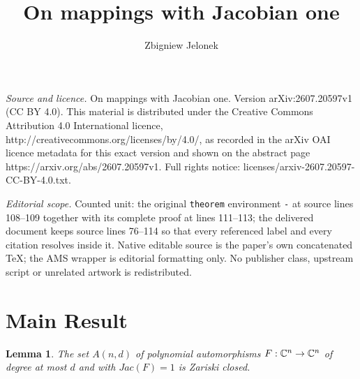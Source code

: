 \documentclass[10pt,a4paper]{amsart}
\newtheorem{lemma}[theorem]{Lemma}
\begin{document}
\title[On mappings with Jacobian one]{On mappings with Jacobian one}
\author{Zbigniew Jelonek}
\date{}
\maketitle
\noindent\emph{Source and licence.} On mappings with Jacobian one. Version arXiv:2607.20597v1 (CC BY 4.0). This material is distributed under the Creative Commons Attribution 4.0 International licence, http://creativecommons.org/licenses/by/4.0/, as recorded in the arXiv OAI licence metadata for this exact version and shown on the abstract page https://arxiv.org/abs/2607.20597v1. Full rights notice: licenses/arxiv-2607.20597-CC-BY-4.0.txt.\par\smallskip
\noindent\textit{Editorial scope.} Counted unit: the original \texttt{theorem} environment \texttt{-} at source lines 108--109 together with its complete proof at lines 111--113; the delivered document keeps source lines 76--114 so that every referenced label and every citation resolves inside it. Native editable source is the paper's own concatenated TeX; the AMS wrapper is editorial formatting only. No publisher class, upstream script or unrelated artwork is redistributed.
\section{Main Result}

\begin{lemma}
The set $A(n, d)$ of polynomial automorphisms $F : \Bbb C^n \to \Bbb C^n$ of degree at most  $d$ and with $Jac(F ) = 1$ is Zariski closed.
\end{lemma}
\end{document}
